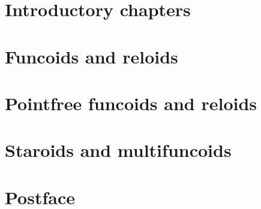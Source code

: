 \documentclass[a4paper,oneside,english,reqno]{amsbook}
\numberwithin{section}{chapter}
\begin{document}

\maketitle

\tableofcontents{}

\part{Introductory chapters}







\part{Funcoids and reloids}














\part{Pointfree funcoids and reloids}



\part{Staroids and multifuncoids}



\part{Postface}






\printindex{}




\addtocounter{figure}{-1}
\label{LASTFIGURE}
\end{document}
